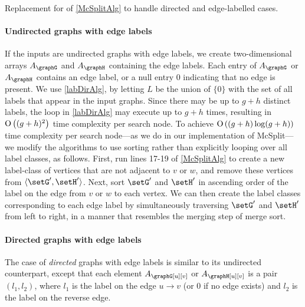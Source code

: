 \begin{algorithm}[h!]
\DontPrintSemicolon
\nl    {}
    \caption{Replacement for  of \cref{McSplitAlg} to handle directed and edge-labelled cases.}
\label{labDirAlg}
\end{algorithm}

\paragraph{Undirected graphs with edge labels} If the inputs are
undirected graphs with edge labels, we create two-dimensional
arrays $A_\graphG$ and $A_\graphH$ containing the edge labels.
Each entry of $A_\graphG$ or $A_\graphH$ contains an
edge label, or a null entry $0$ indicating that no edge is present.  We use \cref{labDirAlg}, by
letting $L$ be the union of $\{0\}$ with the set of all labels that appear in
the input graphs. Since there may be up to $g + h$ distinct labels, the loop in
\cref{labDirAlg} may execute up to $g + h$ times, resulting in $\operatorname{O}\left((g+h)^2\right)$
time complexity per search node.  To achieve $\operatorname{O}\left((g+h) \log (g+h)\right)$ time
complexity per search node---as we do in our implementation of McSplit---we
modify the algorithms to use sorting rather
than explicitly looping over all label classes, as follows.  First, run lines
17-19 of \cref{McSplitAlg} to create a new label-class of vertices that are
not adjacent to $v$ or $w$, and remove these vertices from $\langle \setG',\setH'
\rangle$.  Next, sort $\setG'$ and $\setH'$ in ascending order of the label on the edge
from $v$ or $w$ to each vertex. We can then create the label classes
corresponding to each edge label by simultaneously traversing $\setG'$ and $\setH'$
from left to right, in a manner that resembles the merging step of merge sort.

\paragraph{Directed graphs with edge labels} The case
of \emph{directed} graphs with edge labels is similar to its undirected
counterpart, except that each element $A_\graphG[u][v]$ or $A_\graphH[u][v]$ is a
pair $(l_1, l_2)$, where $l_1$ is the label on the edge $u \rightarrow v$ (or 0
if no edge exists) and $l_2$ is the label on the reverse edge.

